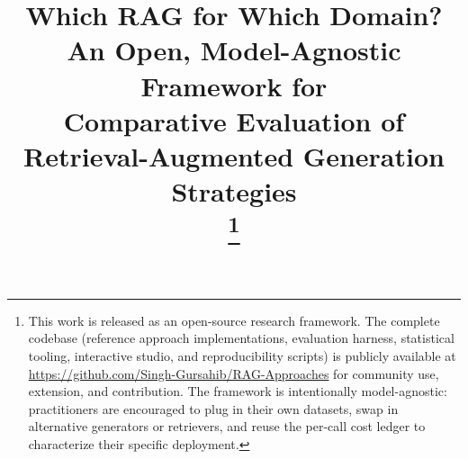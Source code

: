 \documentclass[conference,a4paper,10pt]{IEEEtran}
\begin{document}
\title{Which RAG for Which Domain?\\
{\Large An Open, Model-Agnostic Framework for\\Comparative Evaluation of Retrieval-Augmented Generation Strategies}\\
\thanks{This work is released as an open-source research framework. The complete codebase (reference approach implementations, evaluation harness, statistical tooling, interactive studio, and reproducibility scripts) is publicly available at \url{https://github.com/Singh-Gursahib/RAG-Approaches} for community use, extension, and contribution. The framework is intentionally model-agnostic: practitioners are encouraged to plug in their own datasets, swap in alternative generators or retrievers, and reuse the per-call cost ledger to characterize their specific deployment.}}

\author{
}

\maketitle
\end{document}
